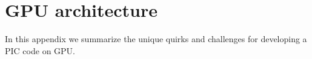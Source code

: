 
\chapter{GPU architecture}
\label{app:gpu}


In this appendix we summarize the unique quirks and challenges for developing a
PIC code on GPU.


